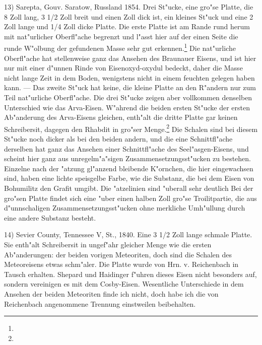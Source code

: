 \documentclass[a4paper, 11pt, oneside]{article}
\begin{document}
13) Sarepta, Gouv. Saratow, Russland 1854. Drei St"ucke, eine gro"se Platte, die 8 Zoll lang, 3 1/2 Zoll breit und einen Zoll dick ist, ein kleines St"uck und eine 2 Zoll lange und 1/4 Zoll dicke Platte. Die erste Platte ist am Rande rund herum mit nat"urlicher Oberfl"ache begrenzt und l"asst hier auf der einen Seite die runde W"olbung der gefundenen Masse sehr gut erkennen.\footnote{} Die nat"urliche Oberfl"ache hat stellenweise ganz das Ansehen des Braunauer Eisens, und ist hier nur mit einer d"unnen Rinde von Eisenoxyd-oxydul bedeckt, daher die Masse nicht lange Zeit in dem Boden, wenigstens nicht in einem feuchten gelegen haben kann. --- Das zweite St"uck hat keine, die kleine Platte an den R"andern nur zum Teil nat"urliche Oberfl"ache. Die drei St"ucke zeigen aber vollkommen denselben Unterschied wie das Arva-Eisen. W"ahrend die beiden ersten St"ucke der ersten Ab"anderung des Arva-Eisens gleichen, enth"alt die dritte Platte gar keinen Schreibersit, dagegen den Rhabdit in gro"ser Menge.\footnote{} Die Schalen sind bei diesem St"ucke noch dicker als bei den beiden andern, und die eine Schnittfl"ache derselben hat ganz das Ansehen einer Schnittfl"ache des Seel"asgen-Eisens, und scheint hier ganz aus unregelm"a"sigen Zusammensetzungsst"ucken zu bestehen. Einzelne nach der "atzung gl"anzend bleibende K"ornchen, die hier eingewachsen sind, haben eine lichte speisgelbe Farbe, wie die Substanz, die bei dem Eisen von Bohumilitz den Grafit umgibt. Die "atzelinien sind "uberall sehr deutlich Bei der gro"sen Platte findet sich eine "uber einen halben Zoll gro"se Troilitpartie, die aus d"unnschaligen Zusammensetzungsst"ucken ohne merkliche Umh"ullung durch eine andere Substanz besteht.

14) Sevier County, Tennessee V, St., 1840. Eine 3 1/2 Zoll lange schmale Platte. Sie enth"alt Schreibersit in ungef"ahr gleicher Menge wie die ersten Ab"anderungen: der beiden vorigen Meteoriten, doch sind die Schalen des Meteoreisens etwas schm"aler. Die Platte wurde von Hrn. v. Reichenbach in Tausch erhalten. Shepard und Haidinger f"uhren dieses Eisen nicht besonders auf, sondern vereinigen es mit dem Cosby-Eisen. Wesentliche Unterschiede in dem Ansehen der beiden Meteoriten finde ich nicht, doch habe ich die von Reichenbach angenommene Trennung einstweilen beibehalten.
\end{document}
